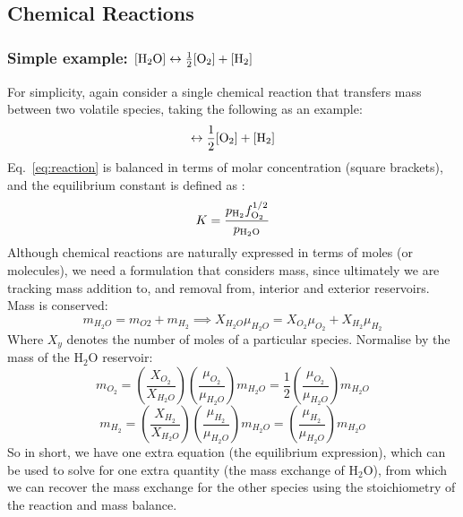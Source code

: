 \subsection{Chemical Reactions}
\label{sect:chemreact}
\subsubsection{Simple example: $[\rm{H}_2O]\leftrightarrow \frac{1}{2} [\rm{O}_2] + [\rm{H}_2]$}
For simplicity, again consider a single chemical reaction that transfers mass between two volatile species, taking the following as an example:
\begin{equation}
    [\rm{H}_2O]\leftrightarrow \frac{1}{2} [\rm{O}_2] + [\rm{H}_2]
    \label{eq:reaction}
\end{equation}
Eq.~\ref{eq:reaction} is balanced in terms of molar concentration (square brackets), and the equilibrium constant is defined as \cite[e.g.][]{SF17}:
\begin{equation}
K=\frac{p_{\rm H_2} f_{\rm O_2}^{1/2}}{p_{\rm H_2\rm O}}
\end{equation}
Although chemical reactions are naturally expressed in terms of moles (or molecules), we need a formulation that considers mass, since ultimately we are tracking mass addition to, and removal from, interior and exterior reservoirs.  Mass is conserved:
\begin{equation}
m_{H_2O} = m_{O2} + m_{H_2} \implies X_{H_2O} \mu_{H_2O} = X_{O_2} \mu_{O_2} + X_{H_2} \mu_{H_2}
\label{eq:reaction_mass}
\end{equation}
Where $X_y$ denotes the number of moles of a particular species.  Normalise by the mass of the H$_2$O reservoir:
\begin{equation}
m_{O_2} = \left( \frac{X_{O_2}}{X_{H_2O}} \right) \left(\frac{\mu_{O_2}}{\mu_{H_2O}}\right) m_{H_2O} = \frac{1}{2} \left(\frac{\mu_{O_2}}{\mu_{H_2O}}\right) m_{H_2O}
\end{equation}
\begin{equation}
m_{H_2} = \left( \frac{X_{H_2}}{X_{H_2O}} \right) \left(\frac{\mu_{H_2}}{\mu_{H_2O}}\right) m_{H_2O} = \left(\frac{\mu_{H_2}}{\mu_{H_2O}}\right) m_{H_2O}
\end{equation}
So in short, we have one extra equation (the equilibrium expression), which can be used to solve for one extra quantity (the mass exchange of H$_2$O), from which we can recover the mass exchange for the other species using the stoichiometry of the reaction and mass balance.
